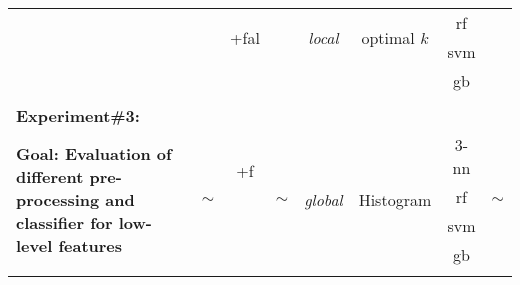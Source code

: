 \begin{landscape}
\begin{table}[ht]
{\begin{center}
{\begin{tabular}{l  c	 c  c  c  c  c  c  }
 & & \multirow{2}{*}{+\acs{fal}} & & \multirow{2}{*}{\emph{local}} & \multirow{2}{*}{optimal $k$} & \ac{rf} &  \\
 & & & & & & \ac{svm} &  \\
 & & & & & & \ac{gb} &  \\
\midrule
\\
\textbf{Experiment\#3:}\\
\multirow{4}{4cm}{\textbf{Goal: Evaluation of different pre-processing and classifier for low-level features}} & \multirow{4}{*}{$\sim$} & \multirow{2}{*}{ +\acs{f}} & \multirow{4}{*}{$\sim$} & \multirow{4}{*}{\emph{global}} & \multirow{4}{*}{Histogram} & $3$-\ac{nn} & \multirow{4}{*}{$\sim$}\\
& & \multirow{2}{*}{+\ac{fal}} & & & & \ac{rf} &  \\
& & & & & & \ac{svm} &  \\
& & & & & & \ac{gb} &  \\
\\
\bottomrule


\end{tabular}}
\end{center}}
\label{tab:experiment_summary}
\end{table}
\end{landscape}
